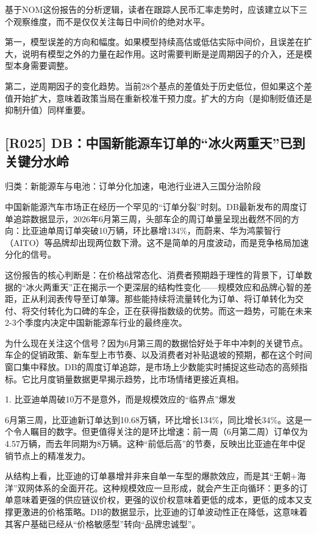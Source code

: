 \documentclass[11pt]{ctexart}
\begin{document}
基于NOM这份报告的分析逻辑，读者在跟踪人民币汇率走势时，应该建立以下三个观察维度，而不是仅仅关注每日中间价的绝对水平。

第一，模型误差的方向和幅度。如果模型持续高估或低估实际中间价，且误差在扩大，说明有模型之外的力量在起作用。这时需要判断是逆周期因子的介入，还是模型本身需要调整。

第二，逆周期因子的变化趋势。当前28个基点的差值处于历史低位，但如果这个差值开始扩大，意味着政策当局在重新校准干预力度。扩大的方向（是抑制贬值还是抑制升值）同样重要。

\subsection{[R025] DB：中国新能源车订单的“冰火两重天”已到关键分水岭}
{\small\color{refgray}归类：新能源车与电池：订单分化加速，电池行业进入三国分治阶段}

中国新能源汽车市场正在经历一个罕见的“订单分裂”时刻。DB最新发布的周度订单追踪数据显示，2026年6月第三周，头部车企的周订单量呈现出截然不同的方向：比亚迪单周订单突破10万辆，环比暴增134\%，而蔚来、华为鸿蒙智行（AITO）等品牌却出现两位数下滑。这不是简单的月度波动，而是竞争格局加速分化的信号。

这份报告的核心判断是：在价格战常态化、消费者预期趋于理性的背景下，订单数据的“冰火两重天”正在揭示一个更深层的结构性变化——规模效应和品牌心智的差距，正从利润表传导至订单簿。那些能持续将流量转化为订单、将订单转化为交付、将交付转化为口碑的车企，正在获得指数级的优势。而这一趋势，可能在未来2-3个季度内决定中国新能源车行业的最终座次。

为什么现在关注这个信号？因为6月第三周的数据恰好处于年中冲刺的关键节点。车企的促销政策、新车型上市节奏、以及消费者对补贴退坡的预期，都在这个时间窗口集中释放。DB的周度订单追踪，是市场上少数能实时捕捉这些动态的高频指标。它比月度销量数据更早揭示趋势，比市场情绪更接近真相。

1. 比亚迪单周破10万不是意外，而是规模效应的“临界点”爆发

6月第三周，比亚迪新订单达到10.68万辆，环比增长134\%，同比增长34\%。这是一个令人瞩目的数字。但更值得关注的是环比增速：前一周（6月第二周）订单仅为4.57万辆，而去年同期为8万辆。这种“前低后高”的节奏，反映出比亚迪在年中促销节点上的精准发力。

从结构上看，比亚迪的订单暴增并非来自单一车型的爆款效应，而是其“王朝+海洋”双网体系的全面开花。这种规模效应一旦形成，就会产生正向循环：更多的订单意味着更强的供应链议价权，更强的议价权意味着更低的成本，更低的成本又支撑更激进的价格策略。DB的数据显示，比亚迪的订单波动性正在降低，这意味着其客户基础已经从“价格敏感型”转向“品牌忠诚型”。
\end{document}
